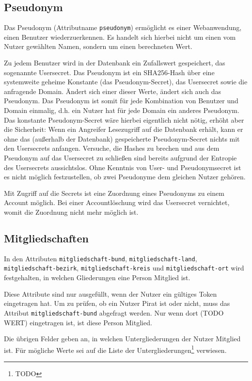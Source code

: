 \documentclass[parskip=half]{scrartcl}
\begin{document}
\subsection{Pseudonym}
\label{sec:pseudo}
Das Pseudonym (Attributname \texttt{pseudonym}) ermöglicht es einer Webanwendung, einen Benutzer wiederzuerkennen.
Es handelt sich hierbei nicht um einen vom Nutzer gewählten Namen, sondern um einen berechneten Wert.

Zu jedem Benutzer wird in der Datenbank ein Zufallswert gespeichert, das sogenannte Usersecret. 
Das Pseudonym ist ein SHA256-Hash über eine systemweite geheime Konstante (das Pseudonym-Secret), das Usersecret sowie die anfragende Domain.
Ändert sich einer dieser Werte, ändert sich auch das Pseudonym.
Das Pseudonym ist somit für jede Kombination von Benutzer und Domain einmalig, d.h. ein Nutzer hat für jede Domain ein anderes Pseudonym.
Das konstante Pseudonym-Secret wäre hierbei eigentlich nicht nötig, erhöht aber die Sicherheit:
Wenn ein Angreifer Lesezugriff auf die Datenbank erhält, kann er ohne das (außerhalb der Datenbank) gespeicherte Pseudonym-Secret nichts mit den Usersecrets anfangen.
Versuche, die Hashes zu brechen und aus dem Pseudonym auf das Usersecret zu schließen sind bereits aufgrund der Entropie des Usersecrets aussichtslos.
Ohne Kenntnis von User- und Pseudonymsecret ist es nicht möglich festzustellen, ob zwei Pseudonyme dem gleichen Nutzer gehören.

Mit Zugriff auf die Secrets ist eine Zuordnung eines Pseudonyms zu einem Account möglich.
Bei einer Accountlöschung wird das Usersecret vernichtet, womit die Zuordnung nicht mehr möglich ist.

\subsection{Mitgliedschaften}
In den Attributen
\texttt{mitgliedschaft-bund}, \texttt{mitgliedschaft-land}, \texttt{mitgliedschaft-bezirk}, \texttt{mitgliedschaft-kreis} und \texttt{mitgliedschaft-ort}
wird festgehalten, in welchen Gliederungen eine Person Mitglied ist.

Diese Attribute sind nur ausgefüllt, wenn der Nutzer ein gültiges Token eingetragen hat.
Um zu prüfen, ob ein Nutzer Pirat ist oder nicht, muss das Attribut \texttt{mitgliedschaft-bund} abgefragt werden.
Nur wenn dort (TODO WERT) eingetragen ist, ist diese Person Mitglied.

Die übrigen Felder geben an, in welchen Untergliederungen der Nutzer Mitglied ist.
Für mögliche Werte sei auf die Liste der Untergliederungen\footnote{TODO} verwiesen.
\end{document}
